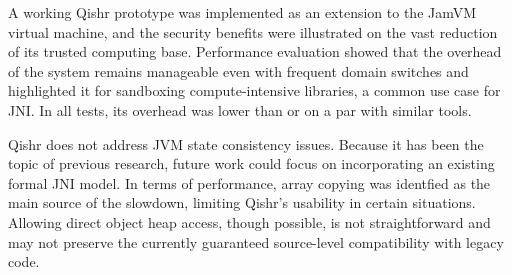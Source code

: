 \documentclass[a4paper,12pt,twoside,openright]{report}
\begin{document}
A working Qishr prototype was implemented as an extension to the JamVM virtual machine, and the security benefits were illustrated on the vast reduction of its trusted computing base. Performance evaluation showed that the overhead of the system remains manageable even with frequent domain switches and highlighted it for sandboxing compute-intensive libraries, a common use case for JNI. In all tests, its overhead was lower than or on a par with similar tools.

Qishr does not address JVM state consistency issues. Because it has been the topic of previous research, future work could focus on incorporating an existing formal JNI model. In terms of performance, array copying was identfied as the main source of the slowdown, limiting Qishr's usability in certain situations. Allowing direct object heap access, though possible, is not straightforward and may not preserve the currently guaranteed source-level compatibility with legacy code.

\appendix
\singlespacing

 
 
\end{document}
